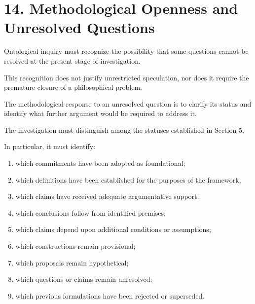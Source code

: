 
\section*{14. Methodological Openness and Unresolved Questions}

Ontological inquiry must recognize
the possibility that some questions
cannot be resolved at the present
stage of investigation.

This recognition does not justify
unrestricted speculation, nor
does it require the premature
closure of a philosophical problem.

The methodological response
to an unresolved question is
to clarify its status and
identify what further argument
would be required to address it.

The investigation must distinguish
among the statuses established
in Section 5.

In particular, it must identify:

\begin{enumerate}

    \item which commitments have
    been adopted as foundational;

    \item which definitions have
    been established for the
    purposes of the framework;

    \item which claims have received
    adequate argumentative support;

    \item which conclusions follow
    from identified premises;

    \item which claims depend upon
    additional conditions or
    assumptions;

    \item which constructions remain
    provisional;

    \item which proposals remain
    hypothetical;

    \item which questions or claims
    remain unresolved;

    \item which previous formulations
    have been rejected or superseded.

\end{enumerate}


